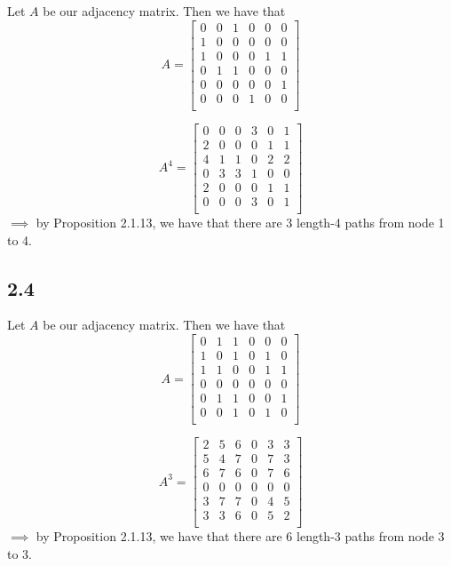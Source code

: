 \documentclass[letterpaper,12pt]{article}
\theoremstyle{definition}
\begin{document}
Let $A$ be our adjacency matrix. Then we have that 
\[A = 
\begin{bmatrix}
    0&0&1&0&0&0\\
    1&0&0&0&0&0\\
    1&0&0&0&1&1\\
    0&1&1&0&0&0\\
    0&0&0&0&0&1\\
    0&0&0&1&0&0\\
\end{bmatrix}
\]

\[A^4 = 
\begin{bmatrix}
    0&0&0&3&0&1\\
    2&0&0&0&1&1\\
    4&1&1&0&2&2\\
    0&3&3&1&0&0\\
    2&0&0&0&1&1\\
    0&0&0&3&0&1\\
\end{bmatrix}
\]
$\implies$ by Proposition 2.1.13, we have that there are 3 length-4 paths from node 1 to 4.

\subsection*{2.4}

Let $A$ be our adjacency matrix. Then we have that 
\[A = 
\begin{bmatrix}
    0&1&1&0&0&0\\
    1&0&1&0&1&0\\
    1&1&0&0&1&1\\
    0&0&0&0&0&0\\
    0&1&1&0&0&1\\
    0&0&1&0&1&0\\
\end{bmatrix}
\]

\[A^3 = 
\begin{bmatrix}
    2&5&6&0&3&3\\
    5&4&7&0&7&3\\
    6&7&6&0&7&6\\
    0&0&0&0&0&0\\
    3&7&7&0&4&5\\
    3&3&6&0&5&2\\
\end{bmatrix}
\]
$\implies$ by Proposition 2.1.13, we have that there are 6 length-3 paths from node 3 to 3.
\end{document}
